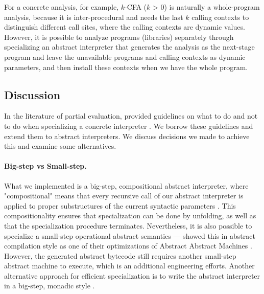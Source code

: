 For a concrete analysis, for example, $k$-CFA ($k$ > 0) is naturally a whole-program analysis,
because it is inter-procedural and needs the last $k$ calling contexts to distinguish
different call sites, where the calling contexts are dynamic values.
However, it is possible to analyze programs (libraries) separately through specializing an abstract interpreter 
that generates the analysis as the next-stage program and leave the unavailable programs and calling contexts 
as dynamic parameters, and then install these contexts when we have the whole program.

\iffalse
Another perspective: programs are data for an abstract interpreter, so if we have $n$ programs, 
then maybe there can be $n$ stages. 
Probably we can analyze first $m$ programs, and generate a residual abstract interpreter
waiting for the rest $(n-m)$ programs.
These $(n-m)$ programs might be (abstract) arguments for the first $n$ programs, and
the abstract interpreter itself might be a partial abstract interpreter.
\fi

\subsection{Discussion}
In the literature of partial evaluation, \citeauthor{10.1007/3-540-61580-6_11} provided guidelines
on what to do and not to do when specializing a concrete interpreter \cite{10.1007/3-540-61580-6_11}. 
We borrow these guidelines and extend them to abstract interpreters. We discuss decisions we made to 
achieve this and examine some alternatives.

\paragraph{Big-step vs Small-step.}
What we implemented is a big-step, compositional abstract interpreter, 
where "compositional" means that every recursive call of our abstract interpreter is applied to proper 
substructures of the current syntactic parameters \cite{10.1007/3-540-61580-6_11}.
This compositionality ensures that specialization can be done by unfolding,
as well as that the specialization procedure terminates.
Nevertheless, it is also possible to specialize a small-step operational abstract semantics ---
\citeauthor{Johnson:2013:OAA:2500365.2500604}
showed this in abstract compilation \cite{Boucher:1996:ACN:647473.727587} style as one of their optimizations
of Abstract Abstract Machines \cite{Johnson:2013:OAA:2500365.2500604}. 
However, the generated abstract bytecode still requires another small-step abstract machine 
to execute, which is an additional engineering efforts.
Another alternative approach for efficient specialization is to write the abstract interpreter 
in a big-step, monadic style \cite{DBLP:journals/pacmpl/DaraisLNH17}.

